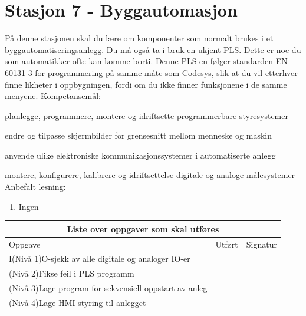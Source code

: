 
\noindent
\section*{Stasjon 7 - Byggautomasjon}

\vskip 5pt
På denne stasjonen skal du lære om komponenter som normalt brukes i et byggautomatiseringsanlegg. Du må også ta i bruk en ukjent PLS. Dette er noe du som automatikker ofte kan komme borti. Denne PLS-en følger standarden EN-60131-3 for programmering på samme måte som Codesys, slik at du vil etterhver finne likheter i oppbygningen, fordi om du ikke finner funksjonene i de samme menyene. 
Kompetansemål:

planlegge, programmere, montere og idriftsette programmerbare styresystemer

endre og tilpasse skjermbilder for grensesnitt mellom menneske og maskin

anvende ulike elektroniske kommunikasjonssystemer i automatiserte anlegg

montere, konfigurere, kalibrere og idriftsettelse digitale og analoge målesystemer
Anbefalt lesning:

\begin{enumerate}
	\item Ingen
\end{enumerate}




\begin{center}
\begin{tabular}{ | m{10cm} | m{1cm}| m{2cm} | } 
\hline
\multicolumn{3}{|c|}{Liste over oppgaver som skal utføres} \\
	\hline
	Oppgave	& Utført & Signatur \\ 
	\hline
	\hline
	\cellcolor{green!60}I(Nivå 1)O-sjekk av alle digitale og analoger IO-er 	& & \\ 
	\hline
	\cellcolor{yellow!60}(Nivå 2)Fikse feil i PLS programm 	& & \\ 
	\hline
	\cellcolor{orange!60}(Nivå 3)Lage program for sekvensiell oppstart av anleg 	& & \\ 
	\hline
	\cellcolor{red!60}(Nivå 4)Lage HMI-styring til anlegget 	& & \\ 
	\hline
\end{tabular}
\end{center}
